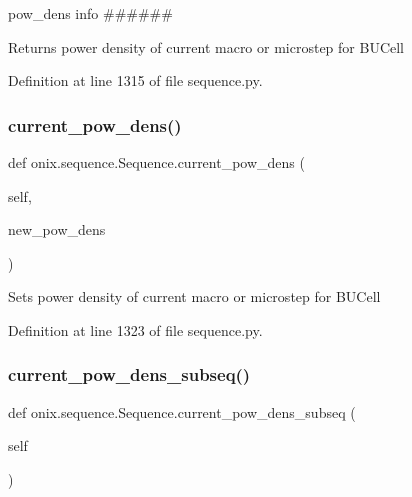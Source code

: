 pow\+\_\+dens info \#\#\#\#\#\# 

\begin{DoxyVerb}Returns power density of current macro or microstep
for BUCell\end{DoxyVerb}
 

Definition at line 1315 of file sequence.\+py.

\mbox{\label{classonix_1_1sequence_1_1Sequence_aceee0aa2f455aa8b86c82b8dc485832d}} 
\subsubsection{\texorpdfstring{current\+\_\+pow\+\_\+dens()}{current\_pow\_dens()}\hspace{0.1cm}{\footnotesize\ttfamily [2/2]}}
{\footnotesize\ttfamily def onix.\+sequence.\+Sequence.\+current\+\_\+pow\+\_\+dens (\begin{DoxyParamCaption}\item[{}]{self,  }\item[{}]{new\+\_\+pow\+\_\+dens }\end{DoxyParamCaption})}

\begin{DoxyVerb}Sets power density of current macro or microstep
for BUCell\end{DoxyVerb}
 

Definition at line 1323 of file sequence.\+py.

\mbox{\label{classonix_1_1sequence_1_1Sequence_a0a07c1fd565dc9e5d1e1875fedb6ee1f}} 
\subsubsection{\texorpdfstring{current\+\_\+pow\+\_\+dens\+\_\+subseq()}{current\_pow\_dens\_subseq()}}
{\footnotesize\ttfamily def onix.\+sequence.\+Sequence.\+current\+\_\+pow\+\_\+dens\+\_\+subseq (\begin{DoxyParamCaption}\item[{}]{self }\end{DoxyParamCaption})}

